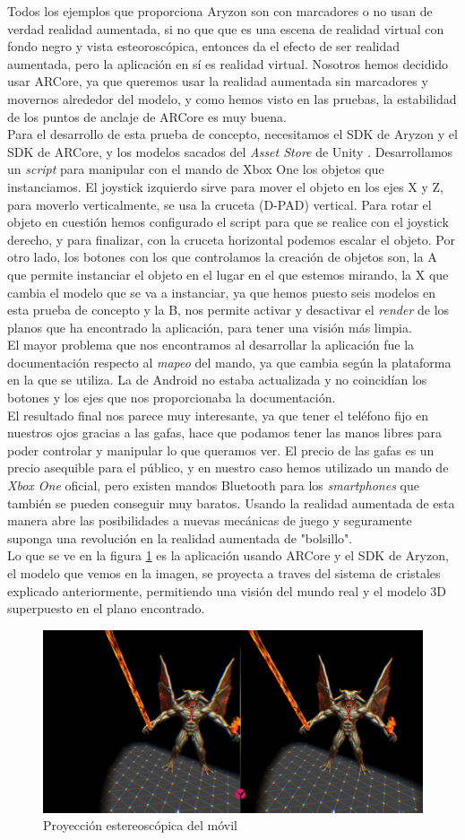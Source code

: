 Todos los ejemplos que proporciona Aryzon son con marcadores o no usan de verdad realidad aumentada, si no que que es una escena de realidad virtual con fondo negro y vista esteoroscópica, entonces da el efecto de ser realidad aumentada, pero la aplicación en sí es realidad virtual. Nosotros hemos decidido usar ARCore, ya que queremos usar la realidad aumentada sin marcadores y movernos alrededor del modelo, y como hemos visto en las pruebas, la estabilidad de los puntos de anclaje de ARCore es muy buena.\\
Para el desarrollo de esta prueba de concepto, necesitamos el SDK de Aryzon y el SDK de ARCore, y los modelos sacados del \textit{Asset Store} de Unity \cite{AssetStore}. Desarrollamos un \textit{script} para manipular con el mando de Xbox One los objetos que instanciamos. El joystick izquierdo sirve para mover el objeto en los ejes X y Z, para moverlo verticalmente, se usa la cruceta (D-PAD) vertical. Para rotar el objeto en cuestión hemos configurado el script para que se realice con el joystick derecho, y para finalizar, con la cruceta horizontal podemos escalar el objeto. Por otro lado, los botones con los que controlamos la creación de objetos son, la A que permite instanciar el objeto en el lugar en el que estemos mirando, la X que cambia el modelo que se va a instanciar, ya que hemos puesto seis modelos en esta prueba de concepto y la B, nos permite activar y desactivar el \textit{render} de los planos que ha encontrado la aplicación, para tener una visión más limpia.\\
El mayor problema que nos encontramos al desarrollar la aplicación fue la documentación respecto al \textit{mapeo} del mando, ya que cambia según la plataforma en la que se utiliza. La de Android no estaba actualizada y no coincidían los botones y los ejes que nos proporcionaba la documentación.\\
El resultado final nos parece muy interesante, ya que tener el teléfono fijo en nuestros ojos gracias a las gafas, hace que podamos tener las manos libres para poder controlar y manipular lo que queramos ver. El precio de las gafas es un precio asequible para el público, y en nuestro caso hemos utilizado un mando de \textit{Xbox One} oficial, pero existen mandos Bluetooth para los \textit{smartphones} que también se pueden conseguir muy baratos. Usando la realidad aumentada de esta manera abre las posibilidades a nuevas mecánicas de juego y seguramente suponga una revolución en la realidad aumentada de "bolsillo".\\
Lo que se ve en la figura \ref{appAryzon} es la aplicación usando ARCore y el SDK de Aryzon, el modelo que vemos en la imagen, se proyecta a traves del sistema de cristales explicado anteriormente, permitiendo una visión del mundo real y el modelo 3D superpuesto en el plano encontrado.

\begin{figure}[H]
    \centering
    \includegraphics[width=0.75\linewidth]{Images/aryzonVisualizer.png}
    \caption{Proyección estereoscópica del móvil}
    \label{appAryzon}
\end{figure}
\noindent